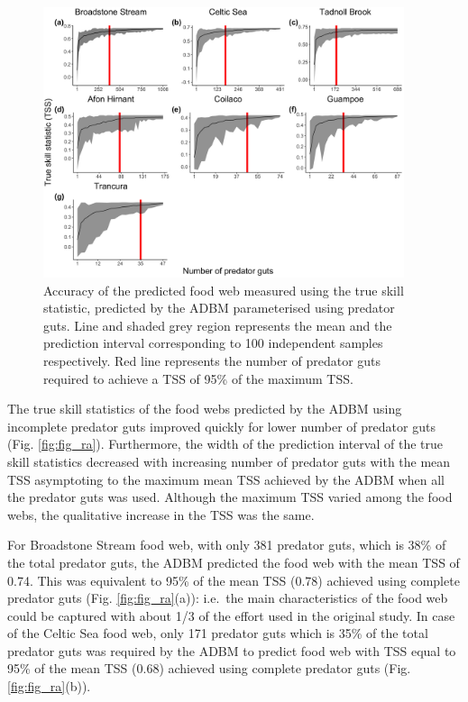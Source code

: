 \documentclass{article}
\begin{document}
\begin{figure}

{\centering \includegraphics[width=400px]{../../results/misc/plot_TSS_vs_ngut} 

}

\caption{\label{fig:fig_ra} Accuracy of the predicted food web measured using the true skill statistic, predicted by the ADBM parameterised using predator guts. Line and shaded grey region represents the mean and the prediction interval corresponding to 100 independent samples respectively. Red line represents the number of predator guts required to achieve a TSS of 95\% of the maximum TSS.}\label{fig:unnamed-chunk-3}
\end{figure}

The true skill statistics of the food webs predicted by the ADBM using
incomplete predator guts improved quickly for lower number of predator
guts (Fig. \ref{fig:fig_ra}). Furthermore, the width of the prediction
interval of the true skill statistics decreased with increasing number
of predator guts with the mean TSS asymptoting to the maximum mean TSS
achieved by the ADBM when all the predator guts was used. Although the
maximum TSS varied among the food webs, the qualitative increase in the
TSS was the same.

For Broadstone Stream food web, with only 381 predator guts, which is
38\% of the total predator guts, the ADBM predicted the food web with
the mean TSS of 0.74. This was equivalent to 95\% of the mean TSS (0.78)
achieved using complete predator guts (Fig. \ref{fig:fig_ra}(a)):
i.e.~the main characteristics of the food web could be captured with
about 1/3 of the effort used in the original study. In case of the
Celtic Sea food web, only 171 predator guts which is 35\% of the total
predator guts was required by the ADBM to predict food web with TSS
equal to 95\% of the mean TSS (0.68) achieved using complete predator
guts (Fig. \ref{fig:fig_ra}(b)).
\end{document}
